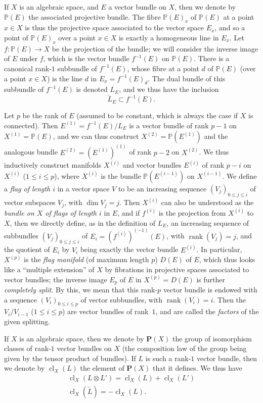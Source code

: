 \documentclass{article}
\theoremstyle{plain}
\theoremstyle{definition}
\newcommand{\PP}{\mathbf{P}}
\renewcommand{\leq}{\leqslant}
\DeclareMathOperator{\rank}{rank}
\DeclareMathOperator{\cl}{cl}
\newcommand{\oldpage}[1]{\marginpar{\footnotesize$\Big\vert$ \textit{p.~#1}}}
\begin{document}
If $X$ is an algebraic space, and $E$ a vector bundle on $X$, then we denote by $\mathbb{P}(E)$ the associated projective bundle.
The fibre $\mathbb{P}(E)_x$ of $\mathbb{P}(E)$ at a point $x\in X$ is thus the projective space associated to the vector space $E_x$, and so a point of $\mathbb{P}(E)_x$ over a point $x\in X$ is exactly a homogeneous line in $E_x$.
Let $f\colon\mathbb{P}(E)\to X$ be the projection of the bundle;
we will consider the inverse image of $E$ under $f$, which is the vector bundle $f^{-1}(E)$ on $\mathbb{P}(E)$.
There is a canonical rank-$1$ subbundle of $f^{-1}(E)$, whose fibre at a point $d$ of $\mathbb{P}(E)$ (over a point $x\in X$) is the line $d$ in $E_x=f^{-1}(E)_d$.
The dual bundle of this subbundle of $f^{-1}(E)$ is denoted $L_E$, and we thus have the inclusion
\[
  \check{L}_E \subset f^{-1}(E).
\]

Let $p$ be the rank of $E$ (assumed to be constant, which is always the case if $X$ is connected).
Then $E^{(1)}=f^{-1}(E)/L_E$ is a vector bundle of rank $p-1$ on $X^{(1)}=\mathbb{P}(E)$, and we can thus construct $X^{(2)}=\mathbb{P}(E^{(1)})$ and the analogous bundle $E^{(2)}=(E^{(1)})^{(1)}$ of rank $p-2$ on $X^{(2)}$.
We thus inductively construct manifolds $X^{(i)}$ and vector bundles $E^{(i)}$ of rank $p-i$ on $X^{(i)}$ ($1\leq i\leq p$), where $X^{(i)}$ is the bundle $\mathbb{P}(E^{(i-1)})$ on $X^{(i-1)}$.
We define a \emph{flag of length $i$} in a vector space $V$ to be an increasing sequence $(V_j)_{0\leq j\leq i}$ of vector subspaces $V_j$, with $\dim V_j=j$.
Then $X^{(i)}$ can also be understood as the \emph{bundle on $X$ of flags of length $i$} in $E$, and if $f^{(i)}$ is the projection from $X^{(i)}$ to $X$, then we directly define, as in the definition of $L_E$, an increasing sequence of subbundles $(V_j)_{0\leq j\leq i}$ of $E_i=(f^{(i)})^{(-1)}(E)$, with $\rank(V_j)=j$, and the quotient of $E_i$ by $V_i$ being exactly the vector bundle $E^{(i)}$.
In particular, $X^{(p)}$ is the \emph{flag manifold} (of maximum length $p$) $D(E)$ of $E$, which thus looks like a ``multiple extension'' of $X$ by fibrations in projective spaces associated to vector bundles;
the inverse image $E_p$ of $E$ in $X^{(p)}=D(E)$ is further \emph{completely split}.
By this, we mean that this rank-$p$ vector bundle is endowed with a sequence $(V_i)_{0\leq i\leq p}$ of vector subbundles,
\oldpage{139}
with $\rank(V_i)=i$.
Then the $V_i/V_{i-1}$ ($1\leq i\leq p$) are vector bundles of rank~$1$, and are called the \emph{factors} of the given splitting.

If $X$ is an algebraic space, then we denote by $\PP(X)$ the group of isomorphism classes of rank-$1$ vector bundles on $X$ (the composition law of the group being given by the tensor product of bundles).
If $L$ is such a rank-$1$ vector bundle, then we denote by $\cl_X(L)$ the element of $\PP(X)$ that it defines.
We thus have
\begin{gather*}
  \cl_X(L\otimes L') = \cl_X(L) + \cl_X(L')
\\\cl_X(\check{L}) = -\cl_X(L).
\end{gather*}
\end{document}
